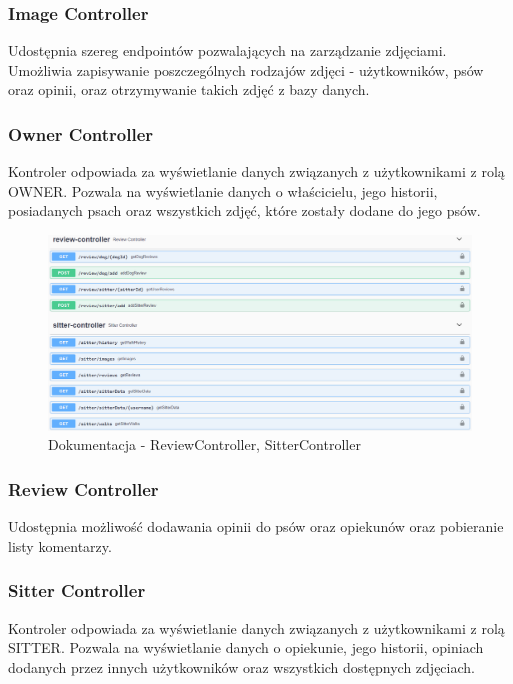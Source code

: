 \subsubsection{Image Controller}
Udostępnia szereg endpointów pozwalających na zarządzanie zdjęciami. Umożliwia zapisywanie poszczególnych rodzajów zdjęci - użytkowników, psów oraz opinii, oraz otrzymywanie takich zdjęć z bazy danych.

\subsubsection{Owner Controller}
Kontroler odpowiada za wyświetlanie danych związanych z użytkownikami z rolą OWNER. Pozwala na wyświetlanie danych o właścicielu, jego historii, posiadanych psach oraz wszystkich zdjęć, które zostały dodane do jego psów.

\begin{figure}[H]
    \centering
    \includegraphics[width=1\linewidth]{rysunki/sw-4.PNG}
    \caption{Dokumentacja - ReviewController, SitterController}
    \label{fig:swagger-4}
\end{figure}
\subsubsection{Review Controller}
Udostępnia możliwość dodawania opinii do psów oraz opiekunów oraz pobieranie listy komentarzy.

\subsubsection{Sitter Controller}
Kontroler odpowiada za wyświetlanie danych związanych z użytkownikami z rolą SITTER. Pozwala na wyświetlanie danych o opiekunie, jego historii, opiniach dodanych przez innych użytkowników oraz wszystkich dostępnych zdjęciach.

